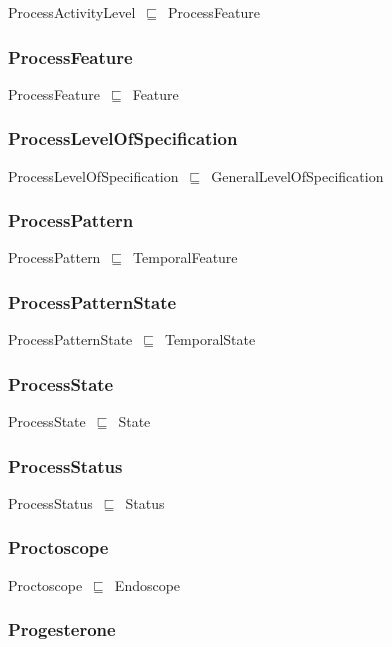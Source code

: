 \documentclass{article}
\begin{document}
ProcessActivityLevel~\ensuremath{\sqsubseteq}~ProcessFeature~

\subsubsection*{ProcessFeature}

ProcessFeature~\ensuremath{\sqsubseteq}~Feature~

\subsubsection*{ProcessLevelOfSpecification}

ProcessLevelOfSpecification~\ensuremath{\sqsubseteq}~GeneralLevelOfSpecification~

\subsubsection*{ProcessPattern}

ProcessPattern~\ensuremath{\sqsubseteq}~TemporalFeature~

\subsubsection*{ProcessPatternState}

ProcessPatternState~\ensuremath{\sqsubseteq}~TemporalState~

\subsubsection*{ProcessState}

ProcessState~\ensuremath{\sqsubseteq}~State~

\subsubsection*{ProcessStatus}

ProcessStatus~\ensuremath{\sqsubseteq}~Status~

\subsubsection*{Proctoscope}

Proctoscope~\ensuremath{\sqsubseteq}~Endoscope~

\subsubsection*{Progesterone}
\end{document}
